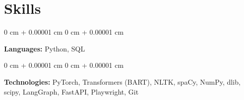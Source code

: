 \documentclass[10pt, letterpaper]{article}
\newenvironment{onecolentry}{
    \begin{adjustwidth}{
        0 cm + 0.00001 cm
    }{
        0 cm + 0.00001 cm
    }
}{
    \end{adjustwidth}
} %
\begin{document}
    \section{Skills}

        \begin{onecolentry}
            \textbf{Languages:} Python, SQL
        \end{onecolentry}

        \vspace{0.10 cm}

        \begin{onecolentry}
            \textbf{Technologies:} PyTorch, Transformers (BART), NLTK, spaCy, NumPy, dlib, scipy, LangGraph, FastAPI, Playwright, Git
        \end{onecolentry}
\end{document}
